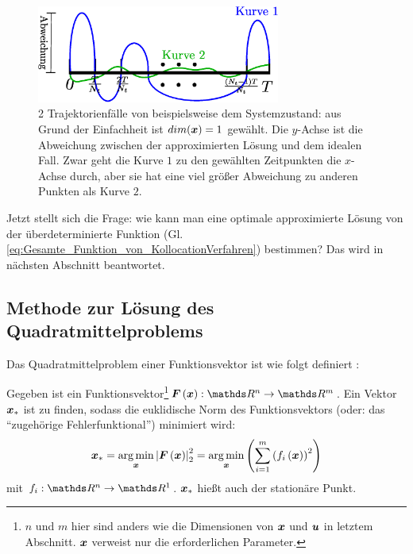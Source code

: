 \begin{figure}
	\centering
	\includegraphics[width=8cm]{bild/modul/Collocation_overdetermined.eps}
	\caption[2 Trajektorienfälle von beispielsweise dem Systemzustand]{2 Trajektorienfälle von beispielsweise dem Systemzustand: aus Grund der Einfachheit ist $dim(\boldsymbol x)=1$ gewählt. Die $y$-Achse ist die Abweichung zwischen der approximierten Lösung und dem idealen Fall. Zwar geht die Kurve $1$ zu den gewählten Zeitpunkten die $x$-Achse durch, aber sie hat eine viel größer Abweichung zu anderen Punkten als Kurve $2$.}
	\label{fig:Collocation_overdetermined}
\end{figure}  

Jetzt stellt sich die Frage: wie kann man eine optimale approximierte Lösung von der überdeterminierte Funktion (Gl. \eqref{eq:Gesamte_Funktion_von_KollocationVerfahren}) bestimmen? Das wird in nächsten Abschnitt beantwortet.
\subsection{Methode zur Lösung des Quadratmittelproblems}
\label{Methode_zur_Lösung_des_Quadratmittelproblems}
Das Quadratmittelproblem einer Funktionsvektor ist wie folgt definiert \cite{knorrenschild2017numerische}:
\begin{definition}[Quadratmittelproblem]
Gegeben ist ein Funktionsvektor\footnote{$n$ und $m$ hier sind anders wie die Dimensionen von $\boldsymbol x$ und $\boldsymbol u$ in letztem Abschnitt. $\boldsymbol x$ verweist nur die erforderlichen Parameter.}${\vect{F\left (\vect{x}\right )}}: \Reals^{n}\to \Reals^{m}$. Ein Vektor ${\boldsymbol x_{\ast}}$ ist zu finden, sodass die euklidische Norm des Funktionsvektors (oder: das ``zugehörige Fehlerfunktional'') minimiert wird:
\begin{eqnarray}
{\boldsymbol x_{\ast}} = \mathop {\operatorname*{arg\,min} }\limits_{\boldsymbol x}\left | {\boldsymbol F}\left ( {\boldsymbol x} \right ) \right |_{2}^{2} = \mathop {\operatorname*{arg\,min} }\limits_{\boldsymbol x}\left ( \sum_{i=1}^{m}\left ( f_{i}\left ( \boldsymbol x \right ) \right )^{2}\right )
\label{Def_LSP}\notag\\
\end{eqnarray}
mit $f_{i}: \Reals^{n}\to \Reals^{1}$. $\boldsymbol x_{\ast}$ hießt auch der stationäre Punkt.
\end{definition}
